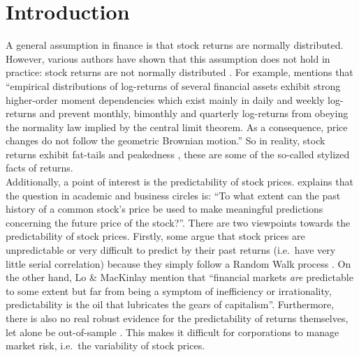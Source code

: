 \documentclass[a4paper, twoside]{templates/ociamthesis}
\begin{document}
\hypertarget{introduction}{%
\chapter*{Introduction}\label{introduction}}

\adjustmtc
{}

A general assumption in finance is that stock returns are normally distributed. However, various authors have shown that this assumption does not hold in practice: stock returns are not normally distributed \autocite{Officer1972}. For example, \textcite{theodossiou2000} mentions that ``empirical distributions of log-returns of several financial assets exhibit strong higher-order moment dependencies which exist mainly in daily and weekly log-returns and prevent monthly, bimonthly and quarterly log-returns from obeying the normality law implied by the central limit theorem. As a consequence, price changes do not follow the geometric Brownian motion.'' So in reality, stock returns exhibit fat-tails and peakedness \autocite{Officer1972}, these are some of the so-called stylized facts of returns.~\\

Additionally, a point of interest is the predictability of stock prices. \textcite{fama1965} explains that the question in academic and business circles is: ``To what extent can the past history of a common stock's price be used to make meaningful predictions concerning the future price of the stock?''. There are two viewpoints towards the predictability of stock prices. Firstly, some argue that stock prices are unpredictable or very difficult to predict by their past returns (i.e.~have very little serial correlation) because they simply follow a Random Walk process \autocite{Fama1970}. On the other hand, Lo \& MacKinlay mention that ``financial markets \emph{are} predictable to some extent but far from being a symptom of inefficiency or irrationality, predictability is the oil that lubricates the gears of capitalism''. Furthermore, there is also no real robust evidence for the predictability of returns themselves, let alone be out-of-sample \autocite{welch2008}. This makes it difficult for corporations to manage market risk, i.e.~the variability of stock prices. ~\\
\end{document}
